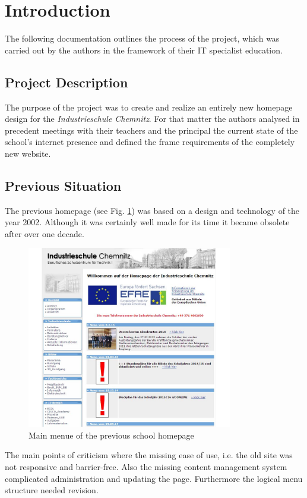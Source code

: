 \section{Introduction}
\label{sec:Introduction}

The following documentation outlines the process of the project, which was carried out by the authors
in the framework of their IT specialist education.

\subsection{Project Description}
\label{sec:ProjectDescription}
The purpose of the project was to create and realize an entirely new homepage design for the \textit{In\-dus\-trie\-schu\-le Chemnitz}. For 
that matter the authors analysed in precedent meetings with their teachers and the principal the current state of the school's
 internet presence and defined the frame requirements of the completely new website.

\subsection{Previous Situation}
\label{sec:PreviousSituation}
The previous homepage (see Fig. \ref{fig:pageOld}) was based on a design and technology of the year 2002. Although it was certainly well made for its time
it became obsolete after over one decade.
\begin{figure}[ht]
	\centering
	\includegraphics[width=0.80\textwidth]{./Bilder/oldpage.jpg}
	\caption{Main menue of the previous school homepage}
	\label{fig:pageOld}
\end{figure}
The main points of criticism where the missing ease of use, i.e. the old site was not responsive and barrier-free. Also 
the missing content management system complicated administration and updating the page. Furthermore the logical 
menu structure needed revision.

